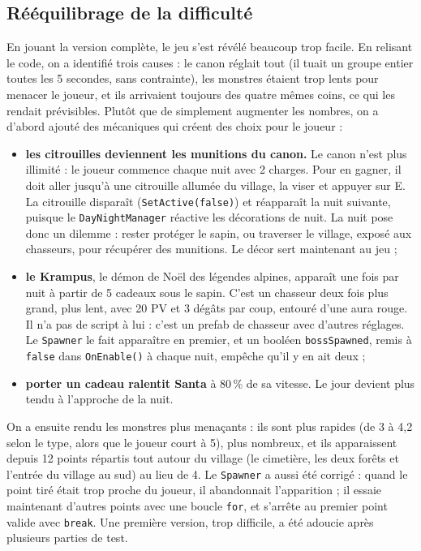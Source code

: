 \documentclass[11pt,a4paper]{article}
\begin{document}
\subsection{Rééquilibrage de la difficulté}
En jouant la version complète, le jeu s'est révélé beaucoup trop facile. En relisant le code, on a identifié trois causes : le canon réglait tout (il tuait un groupe entier toutes les 5 secondes, sans contrainte), les monstres étaient trop lents pour menacer le joueur, et ils arrivaient toujours des quatre mêmes coins, ce qui les rendait prévisibles. Plutôt que de simplement augmenter les nombres, on a d'abord ajouté des mécaniques qui créent des choix pour le joueur :
\begin{itemize}
  \item \textbf{les citrouilles deviennent les munitions du canon.} Le canon n'est plus illimité : le joueur commence chaque nuit avec 2 charges. Pour en gagner, il doit aller jusqu'à une citrouille allumée du village, la viser et appuyer sur E. La citrouille disparaît (\texttt{SetActive(false)}) et réapparaît la nuit suivante, puisque le \texttt{DayNightManager} réactive les décorations de nuit. La nuit pose donc un dilemme : rester protéger le sapin, ou traverser le village, exposé aux chasseurs, pour récupérer des munitions. Le décor sert maintenant au jeu ;
  \item \textbf{le Krampus}, le démon de Noël des légendes alpines, apparaît une fois par nuit à partir de 5 cadeaux sous le sapin. C'est un chasseur deux fois plus grand, plus lent, avec 20 PV et 3 dégâts par coup, entouré d'une aura rouge. Il n'a pas de script à lui : c'est un prefab de chasseur avec d'autres réglages. Le \texttt{Spawner} le fait apparaître en premier, et un booléen \texttt{bossSpawned}, remis à \texttt{false} dans \texttt{OnEnable()} à chaque nuit, empêche qu'il y en ait deux ;
  \item \textbf{porter un cadeau ralentit Santa} à 80\,\% de sa vitesse. Le jour devient plus tendu à l'approche de la nuit.
\end{itemize}
On a ensuite rendu les monstres plus menaçants : ils sont plus rapides (de 3 à 4,2 selon le type, alors que le joueur court à 5), plus nombreux, et ils apparaissent depuis 12 points répartis tout autour du village (le cimetière, les deux forêts et l'entrée du village au sud) au lieu de 4. Le \texttt{Spawner} a aussi été corrigé : quand le point tiré était trop proche du joueur, il abandonnait l'apparition ; il essaie maintenant d'autres points avec une boucle \texttt{for}, et s'arrête au premier point valide avec \texttt{break}. Une première version, trop difficile, a été adoucie après plusieurs parties de test.
\end{document}
